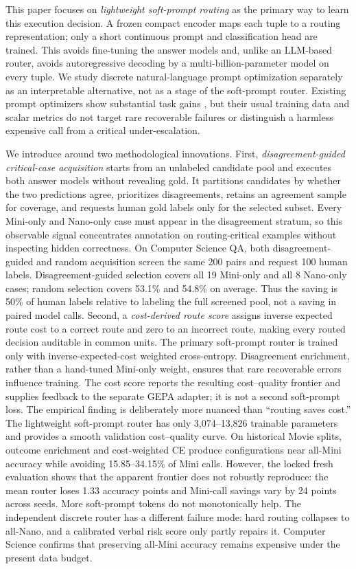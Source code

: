This paper focuses on \emph{lightweight soft-prompt routing} as the primary
way to learn this execution decision. A frozen compact encoder maps each tuple
to a routing representation; only a short continuous prompt and classification
head are trained. This avoids fine-tuning the answer models and, unlike an
LLM-based router, avoids autoregressive decoding by a multi-billion-parameter
model on every tuple. We study discrete natural-language prompt optimization
separately as an interpretable alternative, not as a stage of the soft-prompt
router. Existing prompt optimizers show substantial task gains
\cite{pryzant2023protegi,opsahlong2024mipro,agrawal2025gepa}, but their usual
training data and scalar metrics do not target rare recoverable failures or
distinguish a harmless expensive call from a critical under-escalation.

We introduce \system around two methodological innovations. First,
\emph{disagreement-guided critical-case acquisition} starts from an unlabeled
candidate pool and executes both answer models without revealing gold. It
partitions candidates by whether the two predictions agree, prioritizes
disagreements, retains an agreement sample for coverage, and requests human
gold labels only for the selected subset. Every Mini-only and Nano-only case
must appear in the disagreement stratum, so this observable signal concentrates
annotation on routing-critical examples without inspecting hidden correctness.
On Computer Science QA, both disagreement-guided and random acquisition screen
the same 200 pairs and request 100 human labels. Disagreement-guided selection
covers all 19 Mini-only and all 8 Nano-only cases; random selection covers
53.1\% and 54.8\% on average. Thus the saving is 50\% of human labels relative
to labeling the full screened pool, not a saving in paired model calls. Second,
a \emph{cost-derived route score} assigns inverse expected route cost to a
correct route and zero to an incorrect route, making every routed decision
auditable in common units. The primary soft-prompt router is trained only with
inverse-expected-cost weighted cross-entropy. Disagreement enrichment, rather
than a hand-tuned Mini-only weight, ensures that rare recoverable errors
influence training. The cost score reports the resulting cost--quality frontier
and supplies feedback to the separate GEPA adapter; it is not a second
soft-prompt loss.
The empirical finding is deliberately more nuanced than ``routing saves
cost.'' The lightweight soft-prompt router has only 3,074--13,826 trainable
parameters and provides a smooth validation cost--quality curve. On historical
Movie splits, outcome enrichment and cost-weighted CE produce configurations
near all-Mini accuracy while avoiding 15.85--34.15\% of Mini calls. However, the
locked fresh evaluation shows that the apparent frontier does not robustly
reproduce: the mean router loses 1.33 accuracy points and Mini-call savings vary
by 24 points across seeds. More soft-prompt tokens do not monotonically help.
The independent discrete router has a different failure mode: hard routing
collapses to all-Nano, and a calibrated verbal risk score only partly repairs
it. Computer Science confirms that preserving all-Mini accuracy remains
expensive under the present data budget.

